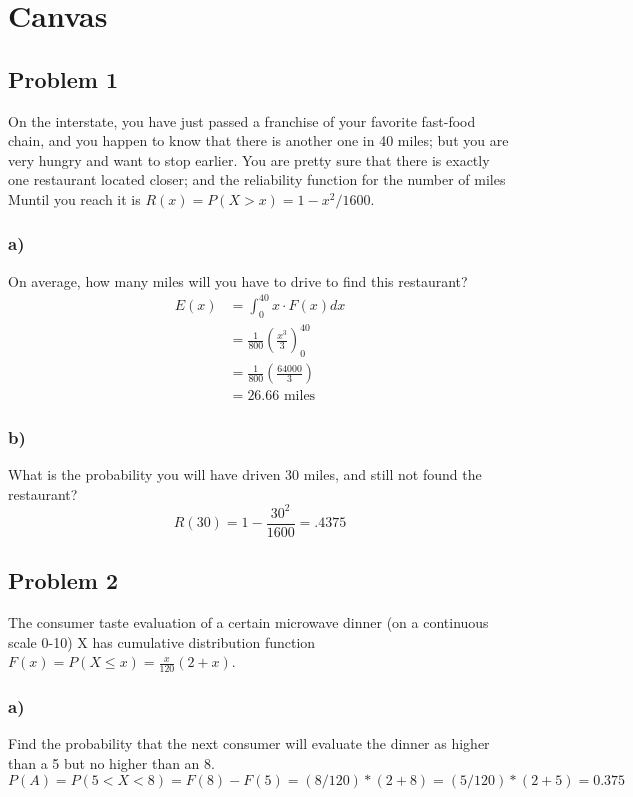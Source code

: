 \documentclass{article}
\begin{document}
\section*{Canvas}
\subsection*{Problem 1}
On the interstate, you have just passed a franchise of your favorite fast-food chain, and you happen to know that there is another one in 40 miles; but you are very hungry and want to stop earlier. You are pretty sure that there is exactly one restaurant located closer; and the reliability function for the number of miles Muntil you reach it is $R(x) = P(X>x) = 1 - x^2/1600$.
\subsubsection*{a)}
On average, how many miles will you have to drive to find this restaurant?
\begin{align}
    E(x) &= \int_0^{40} x \cdot F(x)dx\\
    &= \frac{1}{800}\left(\frac{x^3}{3}\right)^{40}_0\\
    &= \frac{1}{800}\left(\frac{64000}{3}\right)\\
    &= \boxed{26.66\text{ miles}}
\end{align} 
\subsubsection*{b)}
What is the probability you will have driven 30 miles, and still not found the restaurant?
\begin{equation}
    R(30) = 1 - \frac{30^2}{1600} = \boxed{.4375}
\end{equation}
\subsection*{Problem 2}
The consumer taste evaluation of a certain microwave dinner (on a continuous scale 0-10) X has cumulative distribution function $F(x) = P(X\leq x) = \frac{x}{120}(2+x)$.
\subsubsection*{a)}
Find the probability that the next consumer will evaluate the dinner as higher than a 5 but no higher than an 8.
\begin{equation}
    P(A) = P(5<X<8)=F(8)-F(5) =(8/120)*(2+8) =(5/120)*(2+5) = \boxed{0.375}
\end{equation}
\end{document}
